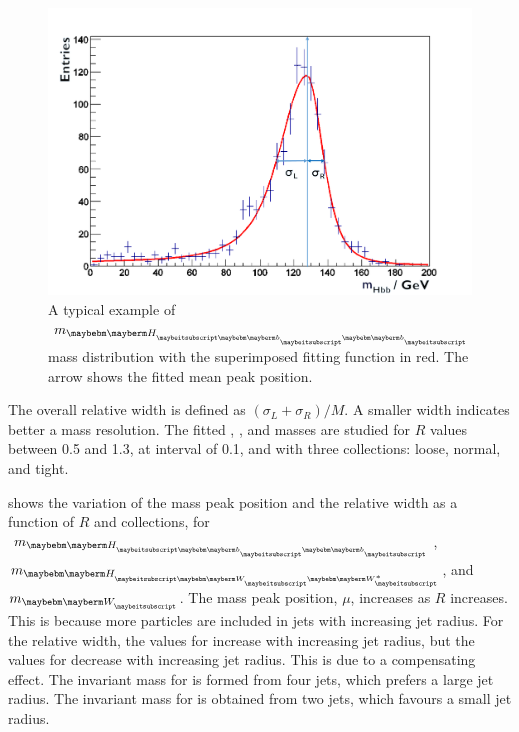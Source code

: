 \begin{figure}[!htbp]
\includegraphics[width=\largefigwidth]{doubleHiggs/MCmassFit2}
\caption[Example MC mass fit for jet optimisation in double Higgs analysis]%
   {A typical example of  $m_{\Hbb}$  mass distribution with the superimposed fitting function in red. The arrow shows the fitted mean peak position.}
   \label{fig:doubleHiggsFitMCMass}
\end{figure}


The overall relative width is defined as $\left(\sigma_L  + \sigma_R\right)/M$. A smaller width indicates better a mass resolution. The fitted \Hbb, \HWW, and \PW masses are studied for $R$ values between 0.5 and 1.3, at interval of 0.1, and with three \PFO collections: loose, normal, and tight.


 shows the variation of the mass peak position and the relative width as a function of $R$ and \PFO collections, for $m_{\Hbb}$, $m_{\HWW}$, and $m_{\PW}$. The mass peak position, $\mu$, increases as $R$ increases. This is because more particles are included in jets with increasing jet radius. For the relative width, the values for \Hbb  increase with increasing jet radius, but the values for \HWW decrease  with increasing jet radius. This is due to a compensating effect. The invariant mass for \HWW is formed from four jets, which prefers a large jet radius. The invariant mass for \HWW is obtained from two jets, which favours a small jet radius.

